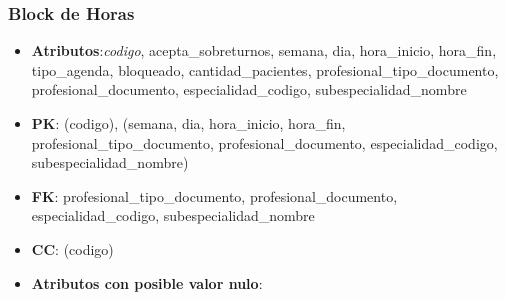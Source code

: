 \documentclass[a4paper,11pt]{article}
\begin{document}
\subsubsection{\textbf{Block de Horas}}

\begin{itemize}

\item 
\textbf{Atributos}:\emph{codigo}, acepta\_sobreturnos, semana, dia, hora\_inicio, hora\_fin, tipo\_agenda, bloqueado, cantidad\_pacientes, profesional\_tipo\_documento, profesional\_documento, especialidad\_codigo, subespecialidad\_nombre

\item 
\textbf{PK}: (codigo), (semana, dia, hora\_inicio, hora\_fin, profesional\_tipo\_documento, profesional\_documento, especialidad\_codigo, subespecialidad\_nombre)

\item
\textbf{FK}:  profesional\_tipo\_documento, profesional\_documento, especialidad\_codigo, subespecialidad\_nombre

\item 
\textbf{CC}: (codigo)

\item 
\textbf{Atributos con posible valor nulo}:

\end{itemize}
\end{document}
